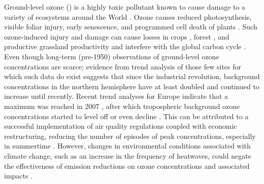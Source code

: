 \documentclass[bg, manuscript]{copernicus}
\begin{document}

\introduction  %
\label{sec:intro}

Ground-level ozone () is a highly toxic pollutant known to cause damage to a variety of ecosystems around the World \citep{PT:Emberson2020}. Ozone causes reduced photosynthesis, visible foliar injury, early senescence, and programmed cell death of plants \citep{PCE:Kangasjarvi2005}. Such ozone-induced injury and damage can cause losses in crops \citep{PJ:Ainsworth2017}, forest \citep{GCB:Wittig2009,EP:Matyssek2012}, and productive grassland productivity and interfere with the global carbon cycle \citep{BGS:Lombardozzi2013}. Even though long-term (pre-1950) observations of ground-level ozone concentrations are scarce; evidence from trend analysis of those few sites for which such data do exist suggests that since the industrial revolution, background concentrations in the northern hemisphere have at least doubled and continued to increase \citep{IPCC2013} until recently. Recent trend analyses for Europe indicate that a maximum was reached in 2007 \citep{AE:Derwent2018}, after which tropospheric background ozone concentrations started to level off or even decline \citep{ESA:Cooper2014, ACP:Wespes2018,ESA:Gaudel2018}. This can be attributed to a successful implementation of air quality regulations coupled with economic restructuring, reducing the number of episodes of peak concentrations, especially in summertime \citep[e.g.,][]{ESA:Fleming2018, ESA:Mills2018}. However, changes in environmental conditions associated with climate change, such as an increase in the frequency of heatwaves, could negate the effectiveness of emission reductions on ozone concentrations and associated impacts \citep{NCC:Lin2020}. 
\end{document}
